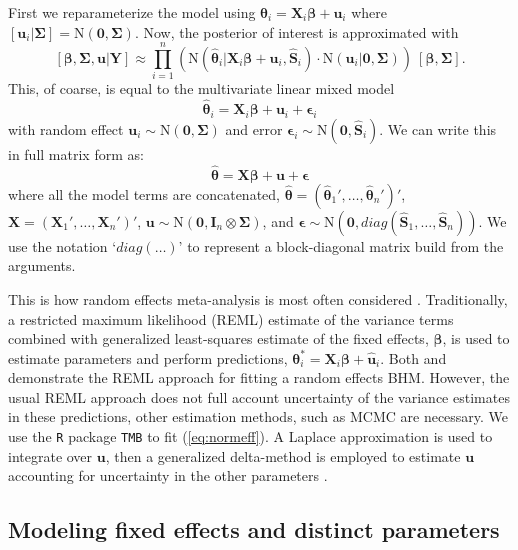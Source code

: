 \documentclass[12pt]{article}
\newcommand{\bt}{\boldsymbol{\theta}}
\newcommand{\bb}{\boldsymbol{\beta}}
\newcommand{\bSig}{\boldsymbol{\Sigma}}
\newcommand{\bS}{\mathbf{S}}
\newcommand{\bX}{\mathbf{X}}
\newcommand{\bu}{\mathbf{u}}
\newcommand{\tN}{\text{N}}
\newcommand{\bY}{\mathbf{Y}}
\newcommand{\bI}{\mathbf{I}}
\newcommand{\bz}{\mathbf{0}}
\begin{document}
First we reparameterize the model using $\bt_i = \bX_i\bb + \bu_i$ where $[\bu_i|\bSig] = \tN(\mathbf{0},\bSig)$. Now, the posterior of interest is approximated with
\begin{equation}
\label{eq:normeff}
[\bb,\bSig,\bu|\bY] \approx  \prod_{i=1}^n\left(\tN(\hat{\bt}_i|\bX_i\bb+\bu_i, \hat{\bS}_i)\cdot \tN(\bu_i|\mathbf{0},\bSig)\right)\ [\bb, \bSig].
\end{equation}
This, of coarse, is equal to the multivariate linear mixed model
\[
\hat{\bt}_i = \bX_i\bb + \bu_i + \boldsymbol{\epsilon}_i
\]
with random effect $\bu_i \sim \text{N}(\mathbf{0},\bSig)$ and error $\boldsymbol{\epsilon}_i \sim \text{N}(\mathbf{0},\hat{\bS}_i)$. We can write this in full matrix form as:
\begin{equation}\label{eq:full.mat.form}
\hat{\bt} = \bX\bb + \bu + \boldsymbol{\epsilon}
\end{equation}
where all the model terms are concatenated, $\hat{\bt} = (\hat{\bt}_1',\dots,\hat{\bt}_n')'$, $\bX = (\bX_1',\dots,\bX_n')'$, $\bu \sim \tN(\bz, \bI_n\otimes\bSig)$, and $\boldsymbol{\epsilon} \sim \tN(\mathbf{0}, diag(\hat{\bS}_1,\dots,\hat{\bS}_n))$. We use the notation `$diag(\dots)$' to represent a block-diagonal matrix build from the arguments. 

This is how random effects meta-analysis is most often considered \citep{higgins2009re}. Traditionally, a restricted maximum likelihood (REML) estimate of the variance terms combined with generalized least-squares estimate of the fixed effects, $\bb$, is used to estimate parameters and perform predictions, $\bt^*_i = \bX_i\bb + \hat{\bu}_i$. Both \citet{burnham2002evaluation} and \cite{zeppelin2019migratory} demonstrate the REML approach for fitting a random effects BHM. However, the usual REML approach does not full account uncertainty of the variance estimates in these predictions, other estimation methods, such as MCMC are necessary. We use the {\tt R} package {\tt TMB} to fit (\ref{eq:normeff}). A Laplace approximation is used to integrate over $\bu$, then a generalized delta-method is employed to estimate $\bu$ accounting for uncertainty in the other parameters \citep{kristensen2016tmb,skaug2006automatic}. 






\subsection{Modeling fixed effects and distinct parameters}
\end{document}
